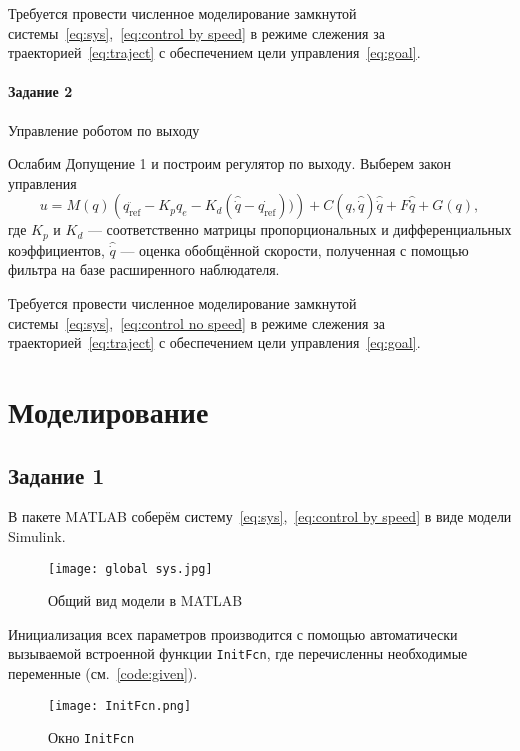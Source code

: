 \documentclass[14pt]{extarticle}
\begin{document}
    Требуется провести численное моделирование замкнутой системы~\eqref{eq:sys},~\eqref{eq:control by speed}
    в режиме слежения за траекторией~\eqref{eq:traject} с обеспечением цели управления~\eqref{eq:goal}.

    \paragraph*{Задание 2} Управление роботом по выходу

    Ослабим Допущение 1 и построим регулятор по выходу. Выберем закон управления
    \begin{equation}
        \label{eq:control no speed}
        u = M(q)\left( \ddot{q_\text{ref}} - K_p q_e - K_d \left( \hat{\dot{q}} - \dot{q_\text{ref}} \right)) \right) + C(q, \hat{\dot{q}})\hat{\dot{q}} + F\hat{\dot{q}} + G(q),
    \end{equation} где $K_p$ и $K_d$ --- соответственно матрицы пропорциональных и дифференциальных коэффициентов,
    $\hat{\dot{q}}$ --- оценка обобщённой скорости, полученная с помощью фильтра на базе расширенного наблюдателя.

    Требуется провести численное моделирование замкнутой системы~\eqref{eq:sys},~\eqref{eq:control no speed}
    в режиме слежения за траекторией~\eqref{eq:traject} с обеспечением цели управления~\eqref{eq:goal}.

    \section*{Моделирование}
    \subsection*{Задание 1}
    В пакете MATLAB соберём систему~\eqref{eq:sys},~\eqref{eq:control by speed} в виде модели Simulink.
    \begin{figure}[H]
        \centering
        \texttt{[image: global sys.jpg]}
        \caption{Общий вид модели в MATLAB}
        \label{pic:global sys}
    \end{figure}

    Инициализация всех параметров производится с помощью автоматически вызываемой встроенной функции \texttt{InitFcn},
    где перечисленны необходимые переменные (см.~\ref{code:given}).
    \begin{figure}[H]
        \centering
        \texttt{[image: InitFcn.png]}
        \caption{Окно \texttt{InitFcn}}
        \label{pic:InitFcn}
    \end{figure}
\end{document}
